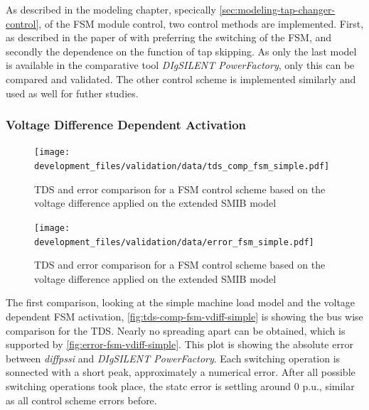 As described in the modeling chapter, specically \autoref{sec:modeling-tap-changer-control}, of the \acs{FSM} module control, two control methods are implemented.
First, as described in the paper of \textcite{burlakin_2024} with preferring the switching of the \acs{FSM}, and secondly the dependence on the function of tap skipping.
As only the last model is available in the comparative tool \textit{DIgSILENT PowerFactory}, only this can be compared and validated. 
The other control scheme is implemented similarly and used as well for futher studies.

\subsubsection{Voltage Difference Dependent Activation}

\begin{figure}[htbp!]
    \centering
    \texttt{[image: development\_files/validation/data/tds\_comp\_fsm\_simple.pdf]}
    \caption[\acs{TDS} and error comparison for a \acs{FSM} control scheme based on the voltage difference applied on the extended \acs{SMIB} model]{\acs{TDS} and error comparison for a \acs{FSM} control scheme based on the voltage difference applied on the extended \acs{SMIB} model}
    \label{fig:tds-comp-fsm-vdiff-simple}
\end{figure}

\begin{figure}[htbp!]
    \centering
    \texttt{[image: development\_files/validation/data/error\_fsm\_simple.pdf]}
    \caption[\acs{TDS} and error comparison for a \acs{FSM} control scheme based on the voltage difference applied on the extended \acs{SMIB} model]{\acs{TDS} and error comparison for a \acs{FSM} control scheme based on the voltage difference applied on the extended \acs{SMIB} model}
    \label{fig:error-fsm-vdiff-simple}
\end{figure}

The first comparison, looking at the simple machine load model and the voltage dependent \acs{FSM} activation, \autoref{fig:tds-comp-fsm-vdiff-simple} is showing the bus wise comparison for the \acs{TDS}.
Nearly no spreading apart can be obtained, which is supported by \autoref{fig:error-fsm-vdiff-simple}.
This plot is showing the absolute error between \textit{diffpssi} and \textit{DIgSILENT PowerFactory}.
Each switching operation is sonnected with a short peak, approximately a numerical error.
After all possible switching operations took place, the statc error is settling around $0$ p.u., similar as all control scheme errors before.

